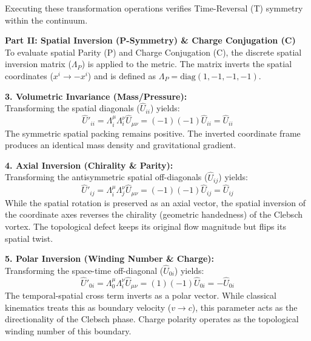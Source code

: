 Executing these transformation operations verifies Time-Reversal (T) symmetry within the continuum. 

\vspace{0.2 cm} 

\textbf{Part II: Spatial Inversion (P-Symmetry) \& Charge Conjugation (C)} \\ 
To evaluate spatial Parity (P) and Charge Conjugation (C), the discrete spatial inversion matrix ($\Lambda_P$) is applied to the metric. The matrix inverts the spatial coordinates ($x^i \to -x^i$) and is defined as $\Lambda_P = \text{diag}(1, -1, -1, -1)$.

\textbf{3. Volumetric Invariance (Mass/Pressure):} \\ 
Transforming the spatial diagonals ($\hat{U}_{ii}$) yields:
\begin{equation}
    \hat{U}'_{ii} = \Lambda^\mu_i \Lambda^\nu_i \hat{U}_{\mu\nu} = (-1)(-1)\hat{U}_{ii} = \hat{U}_{ii} 
\end{equation}
The symmetric spatial packing remains positive. The inverted coordinate frame produces an identical mass density and gravitational gradient. 

\textbf{4. Axial Inversion (Chirality \& Parity):} \\ 
Transforming the antisymmetric spatial off-diagonals ($\hat{U}_{ij}$) yields:
\begin{equation}
    \hat{U}'_{ij} = \Lambda^\mu_i \Lambda^\nu_j \hat{U}_{\mu\nu} = (-1)(-1)\hat{U}_{ij} = \hat{U}_{ij} 
\end{equation}
While the spatial rotation is preserved as an axial vector, the spatial inversion of the coordinate axes reverses the chirality (geometric handedness) of the Clebsch vortex. The topological defect keeps its original flow magnitude but flips its spatial twist. 


\textbf{5. Polar Inversion (Winding Number \& Charge):} \\ 
Transforming the space-time off-diagonal ($\hat{U}_{0i}$) yields:
\begin{equation}
    \hat{U}'_{0i} = \Lambda^\mu_0 \Lambda^\nu_i \hat{U}_{\mu\nu} = (1)(-1)\hat{U}_{0i} = -\hat{U}_{0i} 
\end{equation}
The temporal-spatial cross term inverts as a polar vector. While classical kinematics treats this as boundary velocity ($v \to c$), this parameter acts as the directionality of the Clebsch phase. Charge polarity operates as the topological winding number of this boundary. 

